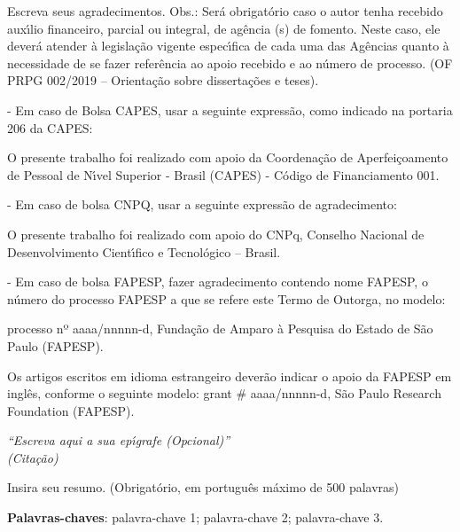 \begin{agradecimentos}
    Escreva seus agradecimentos.
    Obs.: Ser\'{a} obrigat\'{o}rio caso o autor tenha recebido aux\'{\i}lio financeiro, parcial ou integral, de ag\^{e}ncia (s) de fomento. Neste caso, ele dever\'{a} atender \`{a} legisla\c{c}\~{a}o vigente espec\'{\i}fica de cada uma das Ag\^{e}ncias quanto \`{a} necessidade de se fazer refer\^{e}ncia ao apoio recebido e ao n\'{u}mero de processo. (OF PRPG 002/2019 – Orienta\c{c}\~{a}o sobre disserta\c{c}\~{o}es e teses).

    -	Em caso de Bolsa CAPES, usar a seguinte express\~{a}o, como indicado na portaria 206 da CAPES:

    O presente trabalho foi realizado com apoio da Coordena\c{c}\~{a}o de Aperfei\c{c}oamento de Pessoal de N\'{\i}vel Superior - Brasil (CAPES) - C\'{o}digo de Financiamento 001.

    -	Em caso de bolsa CNPQ, usar a seguinte express\~{a}o de agradecimento:

    O presente trabalho foi realizado com apoio do CNPq, Conselho Nacional de Desenvolvimento Cient\'{\i}fico  e Tecnol\'{o}gico – Brasil.

    -	Em caso de bolsa FAPESP, fazer agradecimento contendo nome FAPESP, o n\'{u}mero do processo FAPESP a que se refere este Termo de Outorga, no modelo:

    processo nº aaaa/nnnnn-d, Funda\c{c}\~{a}o de Amparo \`{a} Pesquisa do Estado de S\~{a}o Paulo (FAPESP).

    Os artigos escritos em idioma estrangeiro dever\~{a}o indicar o apoio da FAPESP em ingl\^{e}s, conforme o seguinte modelo: grant \# aaaa/nnnnn-d, S\~{a}o Paulo Research Foundation (FAPESP).
\end{agradecimentos}

\begin{epigrafe}
    \vspace*{\fill}
	\begin{flushright}
		\textit{``Escreva aqui a sua ep\'{\i}grafe (Opcional)''\\
		(Cita\c{c}\~{a}o)}
	\end{flushright}
\end{epigrafe}


\setlength{\absparsep}{18pt} %
\begin{resumo}
 Insira seu resumo. (Obrigat\'{o}rio, em portugu\^{e}s m\'{a}ximo de 500 palavras)

	\lipsum[1]

    \vspace{\onelineskip}

    \noindent\textbf{Palavras-chaves}: palavra-chave 1; palavra-chave 2; palavra-chave 3.
\end{resumo}

